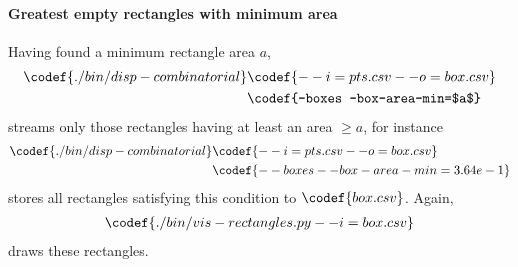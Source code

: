 \paragraph{Greatest empty rectangles with minimum area}

Having found a minimum rectangle area $a$, 
\begin{align*}
  \codef{./bin/disp-combinatorial }&\codef{--i=pts.csv --o=box.csv}\\
  &\codef{--boxes --box-area-min=$a$}
\end{align*}
streams only those rectangles having at least an area $\geq a$, for instance
\begin{align*}
  \codef{./bin/disp-combinatorial }&\codef{--i=pts.csv --o=box.csv}\\
  &\codef{--boxes --box-area-min=3.64e-1}
\end{align*}
stores all rectangles satisfying this condition to $\codef{box.csv}$. Again,
\begin{align*}
  \codef{./bin/vis-rectangles.py --i=box.csv}
\end{align*}
draws these rectangles.

